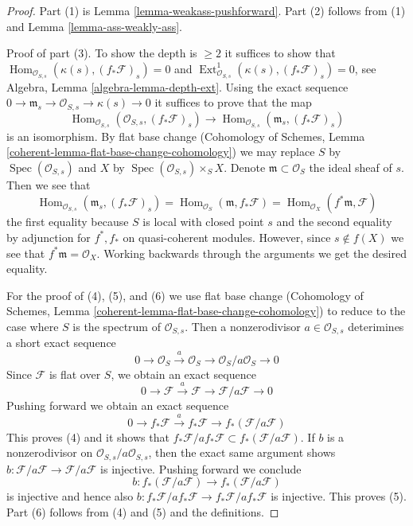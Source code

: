 \documentclass[10pt,a4paper]{amsart}
\theoremstyle{plain}
\theoremstyle{definition}
\theoremstyle{remark}
\numberwithin{equation}{subsection}
\def\Spec{\mathop{\mathrm{Spec}}}
\def\Hom{\mathop{\mathrm{Hom}}\nolimits}
\def\Ext{\mathop{\mathrm{Ext}}\nolimits}
\begin{document}
\begin{proof}
Part (1) is Lemma \ref{lemma-weakass-pushforward}.
Part (2) follows from (1) and Lemma \ref{lemma-ass-weakly-ass}.

\medskip\noindent
Proof of part (3). To show the depth is $\geq 2$ it suffices to show that
$\Hom_{\mathcal{O}_{S, s}}(\kappa(s), (f_*\mathcal{F})_s) = 0$ and
$\Ext^1_{\mathcal{O}_{S, s}}(\kappa(s), (f_*\mathcal{F})_s) = 0$, see
Algebra, Lemma \ref{algebra-lemma-depth-ext}.
Using the exact sequence
$0 \to \mathfrak m_s \to \mathcal{O}_{S, s} \to \kappa(s) \to 0$
it suffices to prove that the map
$$
\Hom_{\mathcal{O}_{S, s}}(\mathcal{O}_{S, s}, (f_*\mathcal{F})_s)
\to
\Hom_{\mathcal{O}_{S, s}}(\mathfrak m_s, (f_*\mathcal{F})_s)
$$
is an isomorphism. By flat base change (Cohomology of Schemes, Lemma
\ref{coherent-lemma-flat-base-change-cohomology})
we may replace $S$ by
$\Spec(\mathcal{O}_{S, s})$ and $X$ by $\Spec(\mathcal{O}_{S, s}) \times_S X$.
Denote $\mathfrak m \subset \mathcal{O}_S$ the ideal sheaf of $s$.
Then we see that
$$
\Hom_{\mathcal{O}_{S, s}}(\mathfrak m_s, (f_*\mathcal{F})_s) =
\Hom_{\mathcal{O}_S}(\mathfrak m, f_*\mathcal{F}) =
\Hom_{\mathcal{O}_X}(f^*\mathfrak m, \mathcal{F})
$$
the first equality because $S$ is local with closed point $s$
and the second equality
by adjunction for $f^*, f_*$ on quasi-coherent modules. However, since
$s \not \in f(X)$ we see that $f^*\mathfrak m = \mathcal{O}_X$.
Working backwards through the arguments we get the desired equality.

\medskip\noindent
For the proof of (4), (5), and (6) we use flat base change
(Cohomology of Schemes, Lemma
\ref{coherent-lemma-flat-base-change-cohomology})
to reduce to the case where $S$ is the spectrum of
$\mathcal{O}_{S, s}$.
Then a nonzerodivisor $a \in \mathcal{O}_{S, s}$
deterimines a short exact sequence
$$
0 \to \mathcal{O}_S \xrightarrow{a} \mathcal{O}_S \to
\mathcal{O}_S/a \mathcal{O}_S \to 0
$$
Since $\mathcal{F}$ is flat over $S$, we obtain an exact sequence
$$
0 \to \mathcal{F} \xrightarrow{a} \mathcal{F} \to
\mathcal{F}/a\mathcal{F} \to 0
$$
Pushing forward we obtain an exact sequence
$$
0 \to f_*\mathcal{F} \xrightarrow{a} f_*\mathcal{F} \to
f_*(\mathcal{F}/a\mathcal{F})
$$
This proves (4) and it shows that
$f_*\mathcal{F}/ af_*\mathcal{F} \subset f_*(\mathcal{F}/a\mathcal{F})$.
If $b$ is a nonzerodivisor on
$\mathcal{O}_{S, s}/a\mathcal{O}_{S, s}$, then the exact same argument shows
$b : \mathcal{F}/a\mathcal{F} \to \mathcal{F}/a\mathcal{F}$
is injective. Pushing forward we conclude
$$
b : f_*(\mathcal{F}/a\mathcal{F}) \to f_*(\mathcal{F}/a\mathcal{F})
$$
is injective and hence also
$b : f_*\mathcal{F}/ af_*\mathcal{F} \to f_*\mathcal{F}/ af_*\mathcal{F}$
is injective. This proves (5). Part (6) follows from
(4) and (5) and the definitions.
\end{proof}
\end{document}
